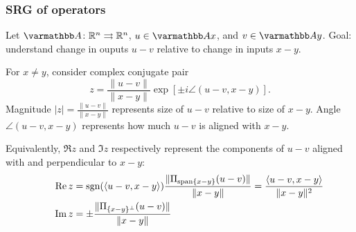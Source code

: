 \documentclass[10pt,mathserif]{beamer}
\begin{document}
\begin{frame}[plain,label=slide_srg_op]
\frametitle{SRG of operators}
Let $\opA\colon\reals^n\rightrightarrows\reals^n$, $u\in \opA x$, and $v\in \opA y$.
Goal: understand change in ouputs $u-v$ relative to change in inputs $x-y$.

\vspace{0.2in}
For $x\ne y$, consider complex conjugate pair
\[
z=
\frac{\|u-v\|}{\|x-y\|}
\exp\left[\pm i \angle (u-v,x-y)\right].
\]
Magnitude $|z|=\tfrac{\|u-v\|}{\|x-y\|}$ represents size of $u-v$ relative to size of $x-y$.
Angle $\angle (u-v,x-y)$ represents how much $u-v$ is aligned with $x-y$.

\vspace{0.2in}
Equivalently, $\Re z$ and $\Im z$ respectively represent the
components of $u-v$ aligned with and perpendicular to $x-y$:
\begin{align*}
\operatorname{Re} z
&=
\textrm{sgn}(\langle u-v,x-y\rangle)\frac{\|\Pi_{\mathrm{span}\{x-y\}}(u-v)\|}{\|x-y\|}
=\frac{\langle u-v,x-y\rangle}{\|x-y\|^2}\nonumber\\
\qquad
\operatorname{Im} z
&=\pm
\frac{\|\Pi_{\{x-y\}^\perp}(u-v)\|}{\|x-y\|}
\end{align*}
\end{frame}
\end{document}
